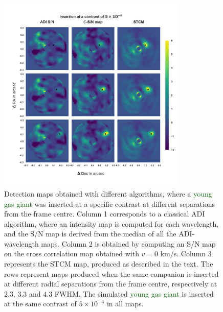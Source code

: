 \documentclass{aa}
\newcommand{\newchange}[1]{\textcolor{darkgreen}{#1}}
\begin{document}
\begin{figure}%
    \centering
    \includegraphics[width=0.8\textwidth]{Fig1_Dec_highres_noinbetween.png}
    \caption{Detection maps obtained with different algorithms, where a \newchange{young gas giant} was inserted at a specific contrast at different separations from the frame centre. Column 1 corresponds to a classical ADI algorithm, where an intensity map is computed for each wavelength, and the S/N map is derived from the median of all the ADI-wavelength maps. Column 2 is obtained by computing an S/N map on the cross correlation map obtained with $v=0$ km/s. Column 3 represents the STCM map, produced as described in the text. The rows represent maps produced when the same companion is inserted at different radial separations from the frame centre, respectively at $2.3$, $3.3$ and $4.3$ FWHM. %
    The simulated \newchange{young gas giant} is inserted at the same contrast of $5\times10^{-4}$ in all maps.}
    \label{fig:fig_1}
\end{figure}
\end{document}
